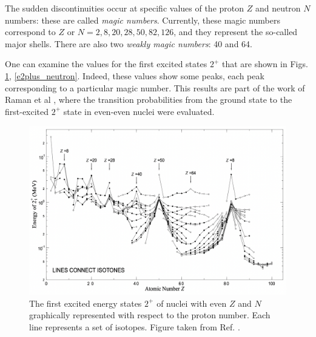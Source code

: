 The sudden discontinuities occur at specific values of the proton $Z$ and neutron $N$ numbers: these are called \emph{magic numbers}. Currently, these magic numbers correspond to $Z$ or $N=2,8,20,28,50,82,126$, and they represent the so-called major shells. There are also two \emph{weakly magic numbers}: 40 and 64.

One can examine the values for the first excited states $2^+$ that are shown in Figs. \ref{e2plus_proton}, \ref{e2plus_neutron}. Indeed, these values show some peaks, each peak corresponding to a particular magic number. This results are part of the work of Raman et al \cite{raman2001transition}, where the transition probabilities from the ground state to the first-excited $2^+$ state in even-even nuclei were evaluated.

\begin{figure}
    \centering
    \includegraphics[scale=0.33]{Chapters/Figures/E2plus_proton.pdf}
    \caption{The first excited energy states $2^+$ of nuclei with even $Z$ and $N$ graphically represented with respect to the proton number. Each line represents a set of isotopes. Figure taken from Ref. \cite{matta2017exotic}.}
    \label{e2plus_proton}
\end{figure}

